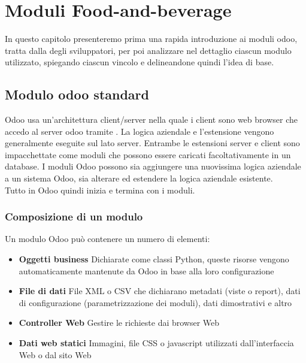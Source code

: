 
\hypertarget{(chap:capitolo4)}{}
\chapter{Moduli Food-and-beverage}
In questo capitolo presenteremo prima una rapida introduzione ai moduli odoo, tratta dalla
 degli sviluppatori, per poi analizzare nel dettaglio ciascun modulo utilizzato, spiegando ciascun vincolo e delineandone quindi l'idea di base.
\section{Modulo odoo standard}
Odoo usa un'architettura client/server nella quale i client sono web browser che accedo al server odoo tramite .
La logica aziendale e l'estensione vengono generalmente eseguite sul lato server.
Entrambe le estensioni server e client sono impacchettate come moduli che possono essere caricati facoltativamente in un database. I moduli Odoo possono sia aggiungere una nuovissima logica aziendale a un sistema Odoo, sia alterare ed estendere la logica aziendale esistente.\\
Tutto in Odoo quindi inizia e termina con i moduli.


\subsection{Composizione di un modulo}
Un modulo Odoo può contenere un numero di elementi:
\newpage
\begin{itemize}
	\item \textbf{Oggetti business} Dichiarate come classi Python, queste risorse vengono automaticamente mantenute da Odoo in base alla loro configurazione
	\item \textbf{File di dati} File XML o CSV che dichiarano metadati (viste o report), dati di configurazione (parametrizzazione dei moduli), dati dimostrativi e altro
	\item \textbf{Controller Web} Gestire le richieste dai browser Web
	\item \textbf{Dati web statici} Immagini, file CSS o javascript utilizzati dall'interfaccia Web o dal sito Web
\end{itemize}

